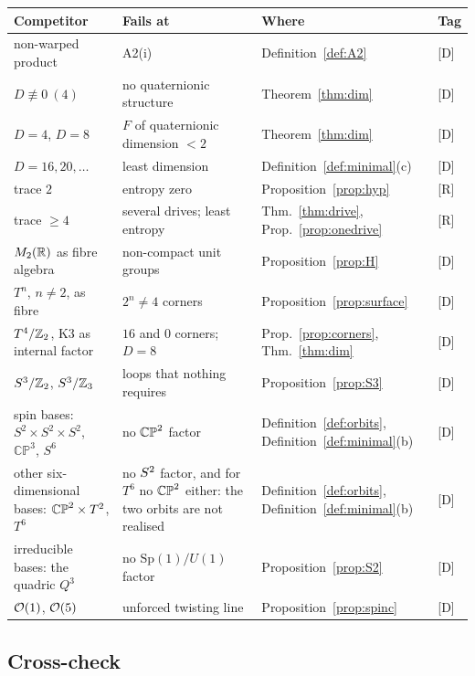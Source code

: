 \documentclass[11pt,a4paper]{article}
\theoremstyle{plain}
\theoremstyle{definition}
\theoremstyle{remark}
\newcommand{\rigR}{[\textup{R}]}
\newcommand{\rigD}{[\textup{D}]}
\begin{document}
\begin{center}
\small
\begin{tabular}{@{}p{}p{}p{}@{\hspace{4pt}}l@{}}
\toprule
Competitor & Fails at & Where & Tag\\
\midrule
non-warped product & A2(i) & Definition~\ref{def:A2} & \rigD\\
$D\not\equiv0\ (4)$ & no quaternionic structure & Theorem~\ref{thm:dim} & \rigD\\
$D=4$, $D=8$ & $F$ of quaternionic dimension $<2$ & Theorem~\ref{thm:dim} & \rigD\\
$D=16,20,\dots$ & least dimension & Definition~\ref{def:minimal}(c) & \rigD\\
trace $2$ & entropy zero & Proposition~\ref{prop:hyp} & \rigR\\
trace $\geq4$ & several drives; least entropy & Thm.~\ref{thm:drive}, Prop.~\ref{prop:onedrive} & \rigR\\
$M_{2}(\mathbb{R})$ as fibre algebra & non-compact unit groups & Proposition~\ref{prop:H} & \rigD\\
$T^{n}$, $n\neq2$, as fibre & $2^{n}\neq4$ corners & Proposition~\ref{prop:surface} & \rigD\\
$T^{4}/\mathbb{Z}_{2}$, K3 as internal factor & $16$ and $0$ corners; $D=8$ & Prop.~\ref{prop:corners}, Thm.~\ref{thm:dim} & \rigD\\
$S^{3}/\mathbb{Z}_{2}$, $S^{3}/\mathbb{Z}_{3}$ & loops that nothing requires & Proposition~\ref{prop:S3} & \rigD\\
spin bases: $S^{2}\times S^{2}\times S^{2}$, $\mathbb{CP}^{3}$, $S^{6}$ & no $\mathbb{CP}^2$ factor & Definition~\ref{def:orbits}, Definition~\ref{def:minimal}(b) & \rigD\\
other six-dimensional bases: $\mathbb{CP}^2\times T^{2}$, $T^{6}$ & no $S^2$ factor, and for $T^{6}$ no $\mathbb{CP}^2$ either: the two orbits are not realised & Definition~\ref{def:orbits}, Definition~\ref{def:minimal}(b) & \rigD\\
irreducible bases: the quadric $Q^{3}$ & no $\mathrm{Sp}(1)/U(1)$ factor & Proposition~\ref{prop:S2} & \rigD\\
$\mathcal{O}(1)$, $\mathcal{O}(5)$ & unforced twisting line & Proposition~\ref{prop:spinc} & \rigD\\
\bottomrule
\end{tabular}
\end{center}

\subsection{Cross-check}
\end{document}
